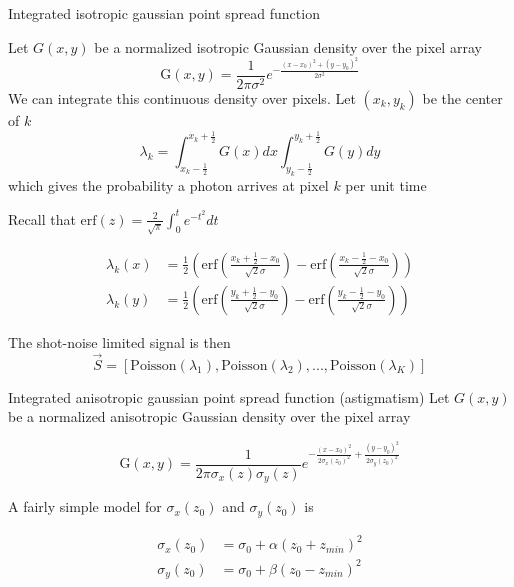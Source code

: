 \documentclass[aspectratio=169]{beamer}
\begin{document}
\begin{frame}{Integrated isotropic gaussian point spread function}

Let $G(x,y)$ be a normalized isotropic Gaussian density over the pixel array
\begin{equation*}
\mathrm{G}(x,y) = \frac{1}{2\pi\sigma^{2}}e^{-\frac{(x-x_{0})^{2}+(y-y_{0})^{2}}{2\sigma^{2}}}
\end{equation*}
We can integrate this continuous density over pixels. Let $(x_{k},y_{k})$ be the center of $k$
\begin{equation*}
\lambda_{k} = \int_{x_{k}-\frac{1}{2}}^{x_{k}+\frac{1}{2}}G(x)dx \int_{y_{k}-\frac{1}{2}}^{y_{k}+\frac{1}{2}} G(y)dy
\end{equation*}
which gives the probability a photon arrives at pixel $k$ per unit time
\end{frame}

\begin{frame}

Recall that $\mathrm{erf}(z) = \frac{2}{\sqrt{\pi}}\int_{0}^{t}e^{-t^{2}}dt$ 

\begin{align*}
\lambda_{k}(x) &= \frac{1}{2}\left(\mathrm{erf}\left(\frac{x_{k}+\frac{1}{2}-x_{0}}{\sqrt{2}\sigma}\right) -\mathrm{erf}\left(\frac{x_{k}-\frac{1}{2}-x_{0}}{\sqrt{2}\sigma}\right)\right)\\
\lambda_{k}(y) &= \frac{1}{2}\left(\mathrm{erf}\left(\frac{y_{k}+\frac{1}{2}-y_{0}}{\sqrt{2}\sigma}\right) -\mathrm{erf}\left(\frac{y_{k}-\frac{1}{2}-y_{0}}{\sqrt{2}\sigma}\right)\right)
\end{align*}

The shot-noise limited signal is then
\begin{equation*}
\vec{S} = \left[\mathrm{Poisson}(\lambda_{1}), \mathrm{Poisson}(\lambda_{2}), ..., \mathrm{Poisson}(\lambda_{K})\right]
\end{equation*}

\end{frame}


\begin{frame}{Integrated anisotropic gaussian point spread function (astigmatism)}
Let $G(x,y)$ be a normalized anisotropic Gaussian density over the pixel array

\begin{equation}
\mathrm{G}(x,y) = \frac{1}{2\pi\sigma_{x}(z)\sigma_{y}(z)}e^{-\frac{(x-x_{0})^{2}}{2\sigma_{x}(z_{0})^{2}}+\frac{(y-y_{0})^{2}}{2\sigma_{y}(z_{0})^{2}}}
\end{equation}

A fairly simple model for $\sigma_{x}(z_{0})$ and $\sigma_{y}(z_{0})$ is

\begin{align*}
\sigma_{x}(z_{0}) &= \sigma_{0} + \alpha(z_{0}+z_{min})^{2}\\
\sigma_{y}(z_{0}) &= \sigma_{0} + \beta(z_{0}-z_{min})^{2}
\end{align*}

\end{frame}
\end{document}
